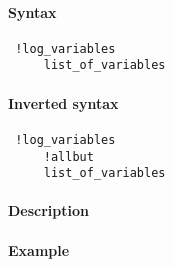 


	\paragraph{Syntax}
 
 \begin{verbatim}
 !log_variables
     list_of_variables
 \end{verbatim}
 
 \paragraph{Inverted syntax}
 
 \begin{verbatim}
 !log_variables
     !allbut
     list_of_variables
 \end{verbatim}
 
 \paragraph{Description}
 
 \paragraph{Example}


